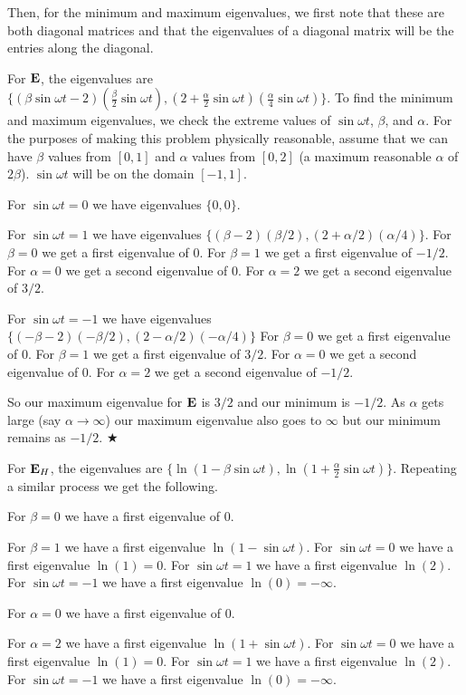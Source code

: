 Then, for the minimum and maximum eigenvalues, we first note that these are both diagonal matrices and that the eigenvalues of a diagonal matrix will be the entries along the diagonal.

For $\mathbf{E}$, the eigenvalues are $\{(\beta \sin{\omega t}-2)(\frac{\beta}{2} \sin{\omega t}), (2 + \frac{\alpha}{2}\sin{\omega t})(\frac{\alpha}{4}\sin{\omega t}) \}$. To find the minimum and maximum eigenvalues, we check the extreme values of $\sin{\omega t}$, $\beta$, and $\alpha$. For the purposes of making this problem physically reasonable, assume that we can have $\beta$ values from $[0,1]$ and $\alpha$ values from $[0,2]$ (a maximum reasonable $\alpha$ of $2\beta$). $\sin{\omega t}$ will be on the domain $[-1,1]$.

For $\sin{\omega t} = 0$ we have eigenvalues $\{0, 0\}$.

For $\sin{\omega t} = 1$ we have eigenvalues $\{(\beta-2)(\beta/2), (2+\alpha/2)(\alpha/4)\}$. For $\beta = 0$ we get a first eigenvalue of $0$. For $\beta = 1$ we get a first eigenvalue of $-1/2$. For $\alpha = 0$ we get a second eigenvalue of $0$. For $\alpha = 2$ we get a second eigenvalue of $3/2$.

For $\sin{\omega t} = -1$ we have eigenvalues $\{(-\beta-2)(-\beta/2), (2-\alpha/2)(-\alpha/4)\}$ For $\beta = 0$ we get a first eigenvalue of $0$. For $\beta = 1$ we get a first eigenvalue of $3/2$. For $\alpha = 0$ we get a second eigenvalue of $0$. For $\alpha = 2$ we get a second eigenvalue of $-1/2$.

So our maximum eigenvalue for $\mathbf{E}$ is $3/2$ and our minimum is $-1/2$. As $\alpha$ gets large (say $\alpha \to \infty$) our maximum eigenvalue also goes to $\infty$ but our minimum remains as $-1/2$.
\hspace*{\fill} $\bigstar$

For $\mathbf{E}_H$, the eigenvalues are $\{\ln(1-\beta\sin{\omega t}), \ln(1+\frac{\alpha}{2}\sin{\omega t}) \}$. Repeating a similar process we get the following.

For $\beta = 0$ we have a first eigenvalue of $0$.

For $\beta = 1$ we have a first eigenvalue $\ln(1-\sin{\omega t})$. For $\sin{\omega t} = 0$ we have a first eigenvalue $\ln(1)=0$. For $\sin{\omega t} = 1$ we have a first eigenvalue $\ln(2)$. For $\sin{\omega t} = -1$ we have a first eigenvalue $\ln(0)=-\infty$.

For $\alpha = 0$ we have a first eigenvalue of $0$.

For $\alpha = 2$ we have a first eigenvalue $\ln(1+\sin{\omega t})$. For $\sin{\omega t} = 0$ we have a first eigenvalue $\ln(1)=0$. For $\sin{\omega t} = 1$ we have a first eigenvalue $\ln(2)$. For $\sin{\omega t} = -1$ we have a first eigenvalue $\ln(0)=-\infty$.

